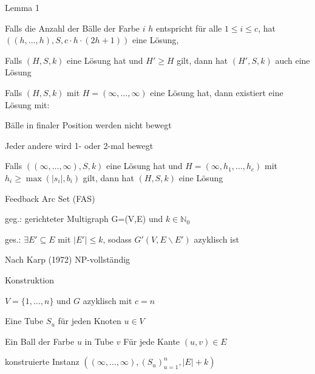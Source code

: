 \documentclass{beamer}
\begin{document}
\begin{frame}{Lemma 1}
\begin{enumlist}
\item Falls die Anzahl der Bälle der Farbe $i$ $h$ entspricht für alle $1 \leq i \leq c$, hat $((h,\dots,h),S,c\cdot h\cdot (2h+1))$ eine Lösung, 
\item Falls $(H,S,k)$ eine Lösung hat und $H' \geq H$ gilt, dann hat $(H',S,k)$ auch eine Lösung
\item Falls $(H,S,k)$ mit $H=(\infty,\dots, \infty)$ eine Lösung hat, dann existiert eine Lösung mit: \begin{pointlist}
\item Bälle in finaler Position werden nicht bewegt
\item Jeder andere wird 1- oder 2-mal bewegt
\end{pointlist}
\item Falls $((\infty, \dots,\infty),S,k)$ eine Lösung hat und $H=(\infty, h_1,\dots, h_c)$ mit $h_i \geq \max(|s_i|,b_i)$ gilt, dann hat $(H,S,k)$ eine Lösung
\end{enumlist}
\end{frame}

\begin{frame}{Feedback Arc Set (FAS)}
\begin{pointlist}
\item geg.: gerichteter Multigraph G=(V,E) und $k\in\mathbb{N}_0$
\item ges.: $\exists E' \subseteq E$ mit $|E'|\leq k$, sodass $G'(V,E\backslash E')$ azyklisch ist
\begin{arrowlist}
\item Nach Karp (1972) NP-vollständig
\end{arrowlist}
\end{pointlist}
\end{frame}

\begin{frame}{Konstruktion}
\begin{pointlist}
\item $V=\{1,\dots,n\}$ und $G$ azyklisch mit $c=n$
\begin{arrowlist}
\item Eine Tube $S_u$ für jeden Knoten $u\in V$
\item Ein Ball der Farbe $u$ in Tube $v$ Für jede Kante $(u,v)\in E$
\item konstruierte Instanz $((\infty, \dots, \infty), (S_u)_{u=1}^n, |E|+k)$
\end{arrowlist}
\end{pointlist}
\end{frame}
\end{document}
